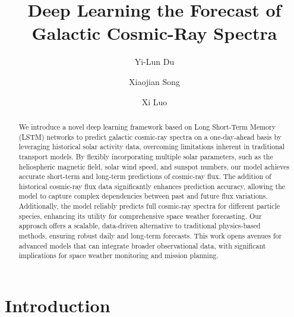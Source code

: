 \documentclass[twocolumn,,12pt]{aastex631}
\begin{document}
\title{Deep Learning the Forecast of Galactic Cosmic-Ray Spectra}

\author{Yi-Lun Du}
\address{Shandong Institute of Advanced Technology, Jinan 250100, China}
\author{Xiaojian Song}
\address{Shandong Institute of Advanced Technology, Jinan 250100, China}
\author{Xi Luo}
\address{Shandong Institute of Advanced Technology, Jinan 250100, China}

\vspace{10pt}

\begin{abstract}
We introduce a novel deep learning framework based on Long Short-Term Memory (LSTM) networks to predict galactic cosmic-ray spectra on a one-day-ahead basis by leveraging historical solar activity data, overcoming limitations inherent in traditional transport models. By flexibly incorporating multiple solar parameters, such as the heliospheric magnetic field, solar wind speed, and sunspot numbers, our model achieves accurate short-term and long-term predictions of cosmic-ray flux. The addition of historical cosmic-ray flux data significantly enhances prediction accuracy, allowing the model to capture complex dependencies between past and future flux variations. Additionally, the model reliably predicts full cosmic-ray spectra for different particle species, enhancing its utility for comprehensive space weather forecasting. Our approach offers a scalable, data-driven alternative to traditional physics-based methods, ensuring robust daily and long-term forecasts. This work opens avenues for advanced models that can integrate broader observational data, with significant implications for space weather monitoring and mission planning.
\end{abstract}

%
%
%
% 
%

\section{Introduction} 
\end{document}
